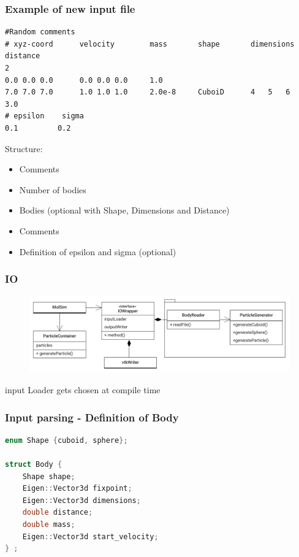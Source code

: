 

\begin{frame}[fragile]
\frametitle{Example of new input file}

 \begin{Verbatim}
#Random comments
# xyz-coord      velocity        mass       shape       dimensions      distance  
2
0.0 0.0 0.0      0.0 0.0 0.0     1.0
7.0 7.0 7.0      1.0 1.0 1.0     2.0e-8     CuboiD      4	5	6         3.0
# epsilon    sigma
0.1         0.2
 \end{Verbatim}

\vspace{-0.5cm}
\large
Structure:
\vspace{-0.7cm}
\begin{itemize}
	\item<1-> Comments
	\item<1-> Number of bodies
	\item<2-> Bodies (optional with Shape, Dimensions and Distance)
	\item<3-> Comments
	\item<4- > Definition of epsilon and sigma (optional)
\end{itemize}

\end{frame}

\begin{frame}
	\frametitle{IO}
	\begin{figure}
		\centering
		\includegraphics[width=0.7\linewidth]{IOWrapper}
		\label{fig:iowrapper}
	\end{figure}
	\large
	\centering
	input Loader gets chosen at compile time
\end{frame}


\begin{frame}[fragile]
\frametitle{Input parsing - Definition of Body}
\vspace{0.7cm}

\begin{lstlisting}[language=C++]
enum Shape {cuboid, sphere};

struct Body {
	Shape shape;   
	Eigen::Vector3d fixpoint; 
	Eigen::Vector3d dimensions; 
	double distance;
	double mass;
	Eigen::Vector3d start_velocity;
} ;
\end{lstlisting}
\end{frame}

